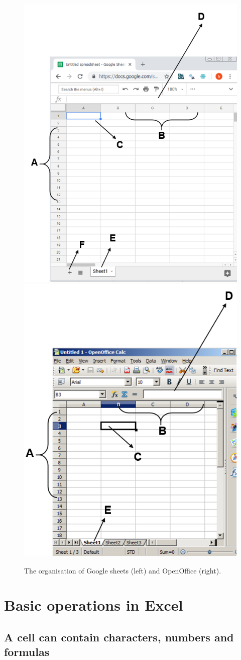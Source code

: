 \documentclass[]{book}
\begin{document}
\begin{figure}

{\centering \includegraphics[width=0.5\linewidth]{_resources/chapter_excelbasic/sheetsstructure} \includegraphics[width=0.5\linewidth]{_resources/chapter_excelbasic/openofficestructure} 

}

\caption{The organisation of Google sheets (left) and OpenOffice (right).}\label{fig:ex2}
\end{figure}

\hypertarget{basic-operations-in-excel}{%
\section{Basic operations in Excel}\label{basic-operations-in-excel}}

\hypertarget{a-cell-can-contain-characters-numbers-and-formulas}{%
\subsection{A cell can contain characters, numbers and formulas}\label{a-cell-can-contain-characters-numbers-and-formulas}}
\end{document}
